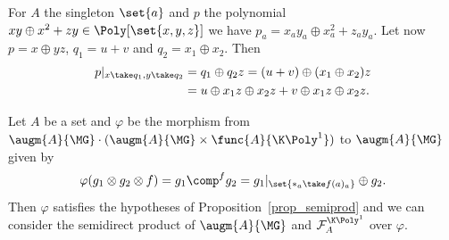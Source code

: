 \begin{exam}
    For $A$ the singleton $\set{a}$ and $p$ the polynomial $xy\oplus x^2 + zy\in\Poly[\set{x,y,z}]$ we 
    have $p_a= x_ay_a\oplus x_a^2 + z_ay_a$. Let now $p=x\oplus yz$, $q_1 = u+v$ and
    $q_2=x_1\oplus x_2$. Then
    \begin{equation}\begin{split}
        p|_{x\take q_1, y\take q_2} &= q_1\oplus q_2z = (u+v)\oplus (x_1\oplus x_2)z \\
        &= u\oplus x_1z\oplus x_2z + v\oplus x_1z\oplus x_2z.
    \end{split}\end{equation}
\end{exam}

\begin{theorem}\label{th_op_ins}
    Let $A$ be a set and $\varphi$ be the morphism from 
    $\augm{A}{\MG}\cdot(\augm{A}{\MG}\times\func{A}{\K\Poly^1})$ to $\augm{A}{\MG}$ given by
    \begin{equation}
        \varphi(g_1\otimes g_2 \otimes f) = g_1\comp^f g_2 = g_1|_{\set{\ast_a\take f(a)_a}}\oplus g_2.
    \end{equation}
    Then $\varphi$ satisfies the hypotheses of Proposition~\ref{prop_semiprod} and we can consider the 
    semidirect product of $\augm{A}{\MG}$ and $\mathcal{F}_A^{\K \Poly^1}$ over $\varphi$.
\end{theorem}


